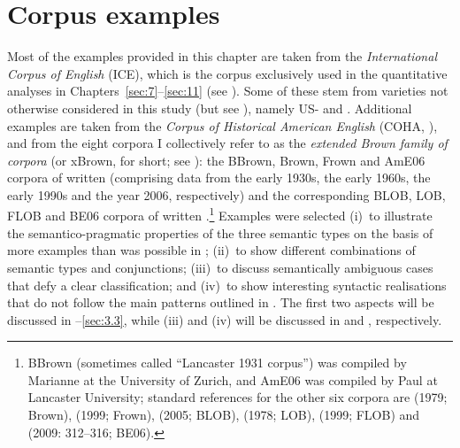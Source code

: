 \chapter{\label{bkm:Ref488657128}Corpus examples}\label{sec:3}

Most of the examples provided in this chapter are taken from the \textit{International Corpus of English} (ICE), which is the corpus exclusively used in the quantitative analyses in Chapters~\ref{sec:7}–\ref{sec:11} (see ). Some of these stem from varieties not otherwise considered in this study (but see \citealt{Schützler2018c}), namely US- and . Additional examples are taken from the \textit{Corpus of Historical American English} (COHA, \citealt{Davies2010}), and from the eight corpora I collectively refer to as the \textit{extended Brown family of corpora} (or xBrown, for short; see \citealt{Baker2009}): the BBrown, Brown, Frown and AmE06 corpora of written  (comprising data from the early 1930s, the early 1960s, the early 1990s and the year 2006, respectively) and the corresponding BLOB, LOB, FLOB and BE06 corpora of written .\footnote{BBrown
  (sometimes called “Lancaster 1931 corpus”) was compiled by Marianne \citet{Hundt2004} at the University of Zurich, and AmE06 was compiled by Paul \citet{Baker2010} at Lancaster University; standard references for the other six corpora are
  \citeauthor{FrancisKučera1979} (1979; Brown),
  \citeauthor{HundtEtAl1999} (1999; Frown),
  \citeauthor{LeechSmith2005} (2005; BLOB),
  \citeauthor{JohanssonEtAl1978} (1978; LOB),
  \citeauthor{HundtEtAl1999} (1999; FLOB) and
  \citeauthor{Baker2009} (2009: 312–316; BE06).
  }
Examples were selected
(i)~to illustrate the semantico-pragmatic properties of the three semantic types on the basis of more examples than was possible in ;
(ii)~to show different combinations of semantic types and conjunctions;
(iii)~to discuss semantically ambiguous cases that defy a clear classification; and
(iv)~to show interesting syntactic realisations that do not follow the main patterns outlined in . The first two aspects will be discussed in –\ref{sec:3.3}, while
(iii) and
(iv) will be discussed in  and , respectively.

